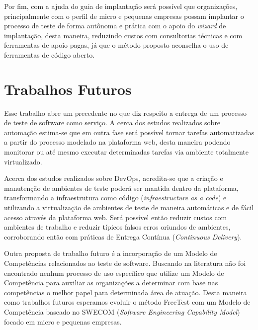 Por fim, com a ajuda do guia de implantação será possível que organizações, principalmente com o perfil de micro e pequenas empresas possam implantar o processo de teste de forma autônoma e prática com o apoio do \textit{wizard} de implantação, desta maneira, reduzindo custos com consultorias técnicas e com ferramentas de apoio pagas, já que o método proposto aconselha o uso de ferramentas de código aberto.

\section{Trabalhos Futuros}
\label{sec:trabalhosfuturos}

Esse trabalho abre um precedente no que diz respeito a entrega de um processo de teste de software como serviço. A cerca dos estudos realizados sobre automação estima-se que em outra fase será possível tornar tarefas automatizadas a partir do processo modelado na plataforma web, desta maneira podendo monitorar ou até mesmo executar determinadas tarefas via ambiente totalmente virtualizado. 

Acerca dos estudos realizados sobre DevOps, acredita-se que a criação e manutenção de ambientes de teste poderá ser mantida dentro da plataforma, transformando a infraestrutura como código (\textit{infraestructure as a code}) e utilizando a virtualização de ambientes de teste de maneira automáticas e de fácil acesso através da plataforma web. Será possível então reduzir custos com ambientes de trabalho e reduzir típicos falsos erros oriundos de ambientes, corroborando então com práticas de Entrega Contínua (\textit{Continuous Delivery}). 

Outra proposta de trabalho futuro é a incorporação de um Modelo de Competências relacionados ao teste de software. Buscando na literatura não foi encontrado nenhum processo de uso específico que utilize um Modelo de Competência para auxiliar as organizações a determinar com base nas competências o melhor papel para determinada área de atuação. Desta maneira como trabalhos futuros esperamos evoluir o método FreeTest com um Modelo de Competência baseado no SWECOM (\textit{Software Engineering Capability Model}) \cite{swecom2017} focado em micro e pequenas empresas. 
